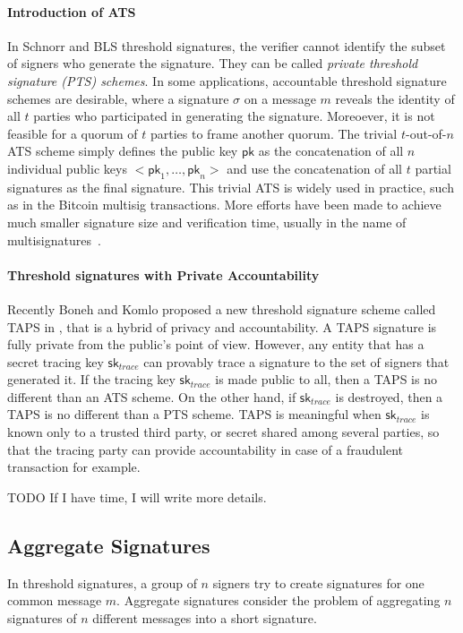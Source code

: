 \paragraph{Introduction of ATS} In Schnorr and BLS threshold signatures, the verifier cannot identify the subset of signers who generate the signature. They can be called \textit{private threshold signature (PTS) schemes}.  In some applications, accountable threshold signature schemes are desirable, where a signature $\sigma$ on a message $m$ reveals the identity of all $t$ parties who participated in generating the signature. Moreoever, it is not feasible for a quorum of $t$ parties to frame another quorum. The trivial $t$-out-of-$n$ ATS scheme simply defines the public key $\mathsf{pk}$ as the concatenation of all $n$ individual public keys $<\mathsf{pk}_1,\dots, \mathsf{pk}_n>$ and use the concatenation of all $t$ partial signatures as the final signature. This trivial ATS is widely used in practice, such as in the Bitcoin multisig transactions. More efforts have been made to achieve much smaller signature size and verification time, usually in the name of multisignatures~\cite{DBLP:conf/crypto/NickRS21}. 

\paragraph{Threshold signatures with Private Accountability} Recently Boneh and Komlo proposed a new threshold signature scheme called TAPS in \cite{DBLP:conf/crypto/BonehK22}, that is a hybrid of privacy and accountability. A TAPS signature is fully private from the public's point of view. However, any entity that has a secret tracing key $\mathsf{sk}_{trace}$ can provably trace a signature to the set of signers that generated it. If the tracing key $\mathsf{sk}_{trace}$ is made public to all, then a TAPS is no different than an ATS scheme. On the other hand, if $\mathsf{sk}_{trace}$ is destroyed, then a TAPS is no different than a PTS scheme. TAPS is meaningful when $\mathsf{sk}_{trace}$ is known only to a trusted third party, or secret shared among several parties, so that the tracing party can provide accountability in case of a fraudulent transaction for example. 

{\color{red} TODO If I have time, I will write more details. } 

\subsection{Aggregate Signatures} \label{subsec:aggregate}
In threshold signatures, a group of $n$ signers try to create signatures for one common message $m$. Aggregate signatures consider the problem of aggregating $n$ signatures of $n$ different messages into a short signature. 

